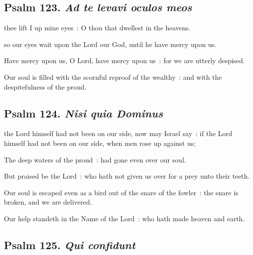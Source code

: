 \subsection{Psalm 123. \textit{Ad te levavi oculos meos}}


 thee lift I up mine eyes~: O thou that dwellest in the heavens.\par
\noindent
so our eyes wait upon the Lord our God, until he have mercy upon us.\par
{}Have mercy upon us, O Lord, have mercy upon us~: for we are utterly despised.\par
{}Our soul is filled with the scornful reproof of the wealthy~: and with the despitefulness of the proud.\par

\subsection{Psalm 124. \textit{Nisi quia Dominus}}


 the Lord himself had not been on our side, now may Israel say~: if the Lord himself had not been on our side, when men rose up against us;\par
{}
The deep waters of the proud~: had gone even over our soul.\par
{}But praised be the Lord~: who hath not given us over for a prey unto their teeth.\par
{}Our soul is escaped even as a bird out of the snare of the fowler~: the snare is broken, and we are delivered.\par
{}Our help standeth in the Name of the Lord~: who hath made heaven and earth.\par

\subsection{Psalm 125. \textit{Qui confidunt}}

